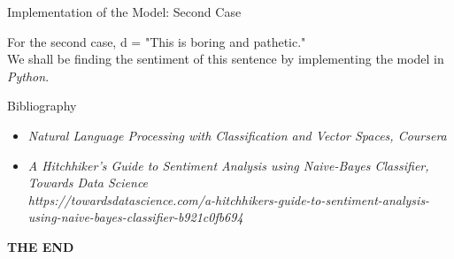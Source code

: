 \documentclass[usenames,dvipsnames]{beamer}
\begin{document}
\begin{frame}{Implementation of the Model: Second Case}
	\begin{block}{}
		For the second case, d = "This is boring and pathetic." \\
		We shall be finding the sentiment of this sentence by implementing the model in \textit{Python}. 
	\end{block}
\end{frame}
\begin{frame}{Bibliography}
	\begin{itemize}
		\item \textit{Natural Language Processing with Classification and Vector Spaces, Coursera}
		\item \textit{A Hitchhiker’s Guide to Sentiment Analysis using Naive-Bayes Classifier, Towards Data Science} \\
		\textit{https://towardsdatascience.com/a-hitchhikers-guide-to-sentiment-analysis-using-naive-bayes-classifier-b921c0fb694} 
	\end{itemize}
\end{frame}
\begin{frame}
	\begin{center}
	\textbf{\Huge THE END}
	\end{center}
\end{frame}
\end{document}
